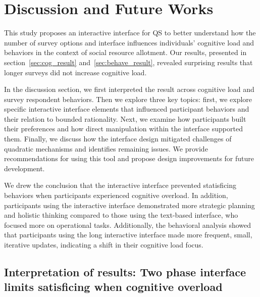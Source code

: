 \section{Discussion and Future Works}
\label{sec:discussion}
This study proposes an interactive interface for QS to better understand how the number of survey options and interface influences individuals' cognitive load and behaviors in the context of social resource allotment. Our results, presented in section~\ref{sec:cog_result} and~\ref{sec:behave_result}, revealed surprising results that longer surveys did not increase cognitive load.

In the discussion section, we first interpreted the result across cognitive load and survey respondent behaviors. Then we explore three key topics: first, we explore specific interactive interface elements that influenced participant behaviors and their relation to bounded rationality. Next, we examine how participants built their preferences and how direct manipulation within the interface supported them. Finally, we discuss how the interface design mitigated challenges of quadratic mechanisms and identifies remaining issues. We provide recommendations for using this tool and propose design improvements for future development.

We drew the conclusion that the interactive interface prevented statisficing behaviors when participants experienced cognitive overload. In addition, participants using the interactive interface demonstrated more strategic planning and holistic thinking compared to those using the text-based interface, who focused more on operational tasks. Additionally, the behavioral analysis showed that participants using the long interactive interface made more frequent, small, iterative updates, indicating a shift in their cognitive load focus.



\subsection{Interpretation of results: Two phase interface limits satisficing when cognitive overload}



